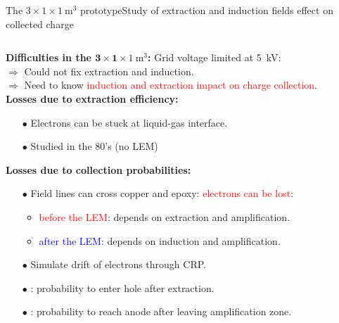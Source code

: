 \documentclass[10pt]{beamer}
\begin{document}
    \begin{frame}{The \texorpdfstring{$3 \times 1 \times \SI{1}{\meter\cubed}$}{311} prototype}{Study of extraction and induction fields effect on collected charge}
    	\begin{scriptsize}
    		\begin{columns}
    			\hspace{-1.5cm}
	    		\begin{column}{0.45\textwidth}
	    			\textbf{Difficulties in the $\mathbf{3 \times 1 \times} \SI[detect-weight]{1}{\meter\cubed}$:} Grid voltage limited at \SI{5}{\kilo\volt}:\\
	    			$\Rightarrow$ Could not fix extraction and induction.\\
	    			$\Rightarrow$ Need to know \textcolor{red}{induction and extraction impact on charge collection}.\\
	    			\vspace{0.3cm}
	    			\textbf{Losses due to extraction efficiency:}
	    			\begin{itemize}
	    				\item[$\bullet$] Electrons can be stuck at liquid-gas interface.
	    				\item[$\bullet$] Studied in the 80's (no LEM)
	    			\end{itemize}
	    			\textbf{Losses due to collection probabilities:}
	    			\begin{itemize}
	    				\item[$\bullet$] Field lines can cross copper and epoxy: \textcolor{red}{electrons can be lost}: 
	    				\begin{itemize}
	    					\item \textcolor{red}{before the LEM}: depends on extraction and amplification.
	    					\item \textcolor{blue}{after the LEM}: depends on induction and amplification.
	    				\end{itemize} 
	    			\end{itemize}
	    			\begin{itemize}
	    				\item[$\bullet$] Simulate drift of electrons through CRP.
	    				\item[$\bullet$] \textcolor{red}{}: probability to enter hole after extraction.
	    				\item[$\bullet$] \textcolor{blue}{}: probability to reach anode after leaving amplification zone.
	    			\end{itemize}

\end{column}
\end{columns}
\end{scriptsize}
\end{frame}
\end{document}
